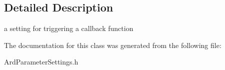 \subsection{Detailed Description}
a setting for triggering a callback function 

The documentation for this class was generated from the following file\-:\begin{DoxyCompactItemize}
\item 
Ard\-Parameter\-Settings.\-h\end{DoxyCompactItemize}
